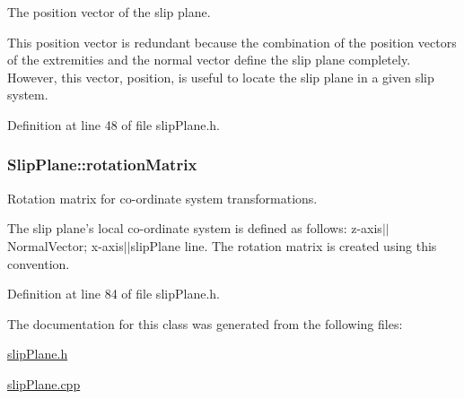 The position vector of the slip plane. 

This position vector is redundant because the combination of the position vectors of the extremities and the normal vector define the slip plane completely. However, this vector, position, is useful to locate the slip plane in a given slip system. 

Definition at line 48 of file slip\-Plane.\-h.

\hypertarget{classSlipPlane_a1aa5aacccb6bb03d163a95251aa10d6c}{
\subsubsection[{rotation\-Matrix}]{ Slip\-Plane\-::rotation\-Matrix\hspace{0.3cm}{\ttfamily [protected]}}}\label{db/d25/classSlipPlane_a1aa5aacccb6bb03d163a95251aa10d6c}


Rotation matrix for co-\/ordinate system transformations. 

The slip plane's local co-\/ordinate system is defined as follows\-: z-\/axis$|$$|$\-Normal\-Vector; x-\/axis$|$$|$slip\-Plane line. The rotation matrix is created using this convention. 

Definition at line 84 of file slip\-Plane.\-h.



The documentation for this class was generated from the following files\-:\begin{DoxyCompactItemize}
\item 
\hyperlink{slipPlane_8h}{slip\-Plane.\-h}\item 
\hyperlink{slipPlane_8cpp}{slip\-Plane.\-cpp}\end{DoxyCompactItemize}
